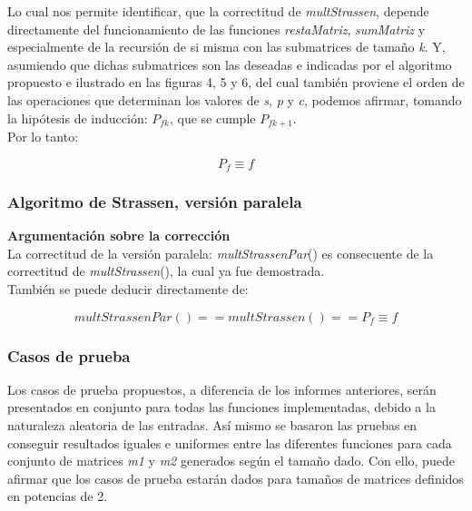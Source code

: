 \documentclass{article}
\begin{document}
Lo cual nos permite identificar, que la correctitud de \textit{multStrassen}, depende directamente del funcionamiento de las funciones \textit{restaMatriz}, \textit{sumMatriz} y especialmente de la recursión de si misma con las submatrices de tamaño \textit{k}. Y, asumiendo que dichas submatrices son las deseadas e indicadas por el algoritmo propuesto e ilustrado en las figuras 4, 5 y 6, del cual también proviene el orden de las operaciones que determinan los valores de \textit{s}, \textit{p} y \textit{c}, podemos afirmar, tomando la hipótesis de inducción: \(P_{fk}\), que se cumple \(P_{fk+1}\).\\

Por lo tanto: 

\begin{equation*}
    P_f \equiv f
\end{equation*}

\subsubsection{Algoritmo de Strassen, versión paralela}

\textbf{Argumentación sobre la corrección}\\

La correctitud de la versión paralela: \textit{multStrassenPar}() es consecuente de la correctitud de \textit{multStrassen}(), la cual ya fue demostrada.\\

También se puede deducir directamente de:

\begin{equation*}
    multStrassenPar() == multStrassen() == P_f \equiv f
\end{equation*}

\subsubsection{Casos de prueba}

Los casos de prueba propuestos, a diferencia de los informes anteriores, serán presentados en conjunto para todas las funciones implementadas, debido a la naturaleza aleatoria de las entradas. Así mismo se basaron las pruebas en conseguir resultados iguales e uniformes entre las diferentes funciones para cada conjunto de matrices \textit{m1} y \textit{m2} generados según el tamaño dado. Con ello, puede afirmar que los casos de prueba estarán dados para tamaños de matrices definidos en potencias de 2.\\
\end{document}
